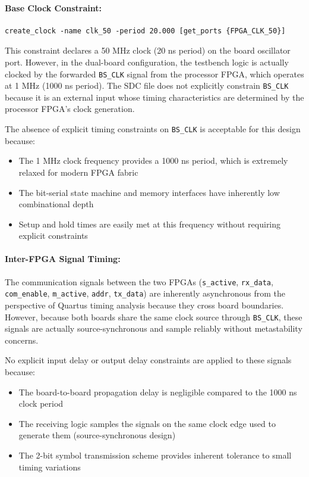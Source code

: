 \documentclass[12pt]{article}
\begin{document}
\paragraph{Base Clock Constraint:}
\begin{verbatim}
create_clock -name clk_50 -period 20.000 [get_ports {FPGA_CLK_50}]
\end{verbatim}

This constraint declares a 50 MHz clock (20 ns period) on the board oscillator port. However, in the dual-board configuration, the testbench logic is actually clocked by the forwarded \texttt{BS\_CLK} signal from the processor FPGA, which operates at 1 MHz (1000 ns period). The SDC file does not explicitly constrain \texttt{BS\_CLK} because it is an external input whose timing characteristics are determined by the processor FPGA's clock generation.

The absence of explicit timing constraints on \texttt{BS\_CLK} is acceptable for this design because:
\begin{itemize}
    \item The 1 MHz clock frequency provides a 1000 ns period, which is extremely relaxed for modern FPGA fabric
    \item The bit-serial state machine and memory interfaces have inherently low combinational depth
    \item Setup and hold times are easily met at this frequency without requiring explicit constraints
\end{itemize}

\paragraph{Inter-FPGA Signal Timing:}
The communication signals between the two FPGAs (\texttt{s\_active}, \texttt{rx\_data}, \texttt{com\_enable}, \texttt{m\_active}, \texttt{addr}, \texttt{tx\_data}) are inherently asynchronous from the perspective of Quartus timing analysis because they cross board boundaries. However, because both boards share the same clock source through \texttt{BS\_CLK}, these signals are actually source-synchronous and sample reliably without metastability concerns.

No explicit input delay or output delay constraints are applied to these signals because:
\begin{itemize}
    \item The board-to-board propagation delay is negligible compared to the 1000 ns clock period
    \item The receiving logic samples the signals on the same clock edge used to generate them (source-synchronous design)
    \item The 2-bit symbol transmission scheme provides inherent tolerance to small timing variations
\end{itemize}
\end{document}
